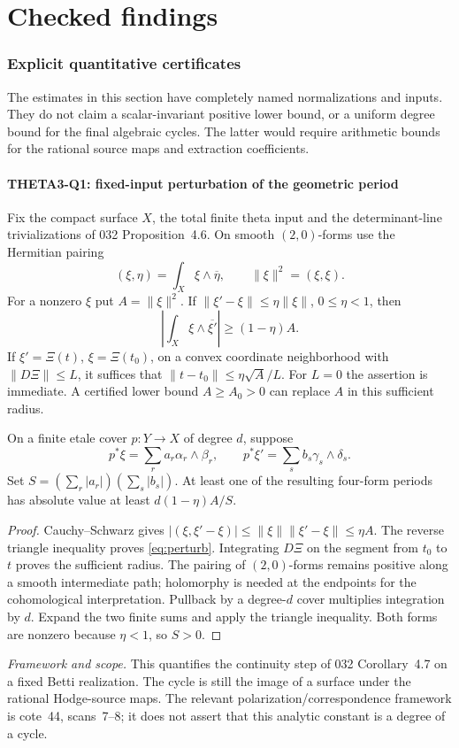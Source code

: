\documentclass[11pt]{article}
\newcommand{\framework}[1]{\par\smallskip\noindent\textit{Framework and scope.} #1\par}
\theoremstyle{definition}\newtheorem{definition}[theorem]{Definition}\newtheorem{remark}[theorem]{Remark}
\begin{document}
\part{Checked findings}
\section{Explicit quantitative certificates}
\label{sec:quantitative}
The estimates in this section have completely named normalizations and inputs. They do not claim a scalar-invariant positive lower bound, or a uniform degree bound for the final algebraic cycles. The latter would require arithmetic bounds for the rational source maps and extraction coefficients.

\subsection{THETA3-Q1: fixed-input perturbation of the geometric period}\label{Q1}
Fix the compact surface $X$, the total finite theta input and the determinant-line trivializations of 032 Proposition~4.6. On smooth $(2,0)$-forms use the Hermitian pairing
\[
 (\xi,\eta)=\int_X\xi\wedge\overline\eta,
 \qquad \|\xi\|^2=(\xi,\xi).
\]
For a nonzero $\xi$ put $A=\|\xi\|^2$. If
$\|\xi'-\xi\|\leq\eta\|\xi\|$, $0\leq\eta<1$, then
\begin{equation}\label{eq:perturb}
 \left|\int_X\xi\wedge\overline{\xi'}\right|
 \geq (1-\eta)A.
\end{equation}
If $\xi'=\Xi(t)$, $\xi=\Xi(t_0)$, on a convex coordinate neighborhood with $\|D\Xi\|\leq L$, it suffices that
$\|t-t_0\|\leq\eta\sqrt A/L$. For $L=0$ the assertion is immediate. A certified lower bound $A\geq A_0>0$ can replace $A$ in this sufficient radius.

On a finite etale cover $p:Y\to X$ of degree $d$, suppose
\[
 p^*\xi=\sum_r a_r\alpha_r\wedge\beta_r,
 \qquad p^*\xi'=\sum_s b_s\gamma_s\wedge\delta_s.
\]
Set $S=(\sum_r|a_r|)(\sum_s|b_s|)$. At least one of the resulting four-form periods has absolute value at least
$d(1-\eta)A/S$.
\begin{proof}
Cauchy--Schwarz gives
$|(\xi,\xi'-\xi)|\leq\|\xi\|\|\xi'-\xi\|\leq\eta A$.
The reverse triangle inequality proves \eqref{eq:perturb}. Integrating $D\Xi$ on the segment from $t_0$ to $t$ proves the sufficient radius. The pairing of $(2,0)$-forms remains positive along a smooth intermediate path; holomorphy is needed at the endpoints for the cohomological interpretation. Pullback by a degree-$d$ cover multiplies integration by $d$. Expand the two finite sums and apply the triangle inequality. Both forms are nonzero because $\eta<1$, so $S>0$.
\end{proof}
\framework{This quantifies the continuity step of 032 Corollary~4.7 on a fixed Betti realization. The cycle is still the image of a surface under the rational Hodge-source maps. The relevant polarization/correspondence framework is cote~44, scans~7--8; it does not assert that this analytic constant is a degree of a cycle.}
\end{document}

